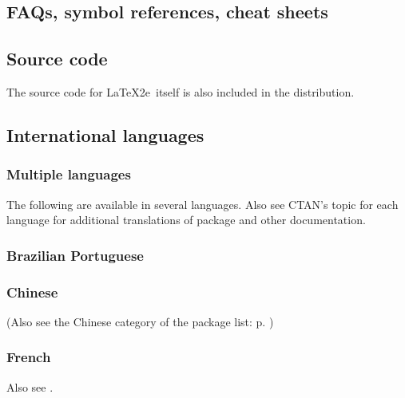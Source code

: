 \documentclass{article}
\def\FAQ{\acro{FAQ}}
\newcommand{\acro}[1]{\textsc{\MakeLowercase{#1}}}
\def\LaTeXe{LaTeX2e}%
\def\acro#1{#1}%
\begin{document}
\subsection{\FAQ{}s, symbol references, cheat sheets}

\printbibliography[
    heading=none,
    category=FAQ,
]


\subsection{Source code}

The source code for \LaTeXe\ itself is also included in the distribution.

\printbibliography[
    heading=none,
    category=source,
]


\subsection{International languages}
\label{sec:international}

\subsubsection{Multiple languages}

    The following are available in several languages.
    Also see CTAN's topic for each language for additional translations of
    package and other documentation.
        \printbibliography[
            heading=none,
            category=langmultiple,
        ]

\subsubsection{Brazilian Portuguese}
        \printbibliography[
            heading=none,
            category=brazilian,
        ]

\subsubsection{Chinese}
    (Also see the Chinese category of the package list: p. \pageref{pkgs:chinese})
        \printbibliography[
            heading=none,
            category=chinese,
        ]

\subsubsection{French}
        Also see .
        \printbibliography[
            heading=none,
            category=french,
        ]
\end{document}
